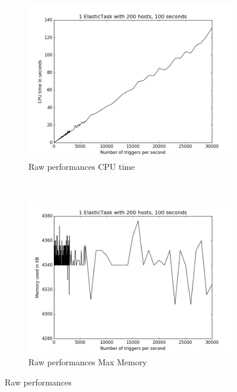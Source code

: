 \documentclass[a4paper, onecolumn]{article}
\begin{document}
    \begin{figure}
      \centering
      \hspace*{-4em}
      \begin{subfigure}[t]{0.6\textwidth}
    	\includegraphics[width=\textwidth]{../plots/raw_perf_oneet_time}
    	\caption{Raw performances CPU time}
    	\label{time_oneet_raw}
      \end{subfigure}%
      ~
      \begin{subfigure}[t]{0.6\textwidth}
    	\includegraphics[width=\textwidth]{../plots/raw_perf_oneet_mem}
    	\caption{Raw performances Max Memory}
    	\label{mem_oneet_raw}
      \end{subfigure}%
      \caption{Raw performances}
    \end{figure}
    
\end{document}
